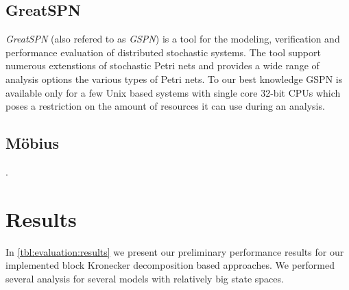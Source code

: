 \subsection{GreatSPN}

\emph{GreatSPN} (also refered to as \emph{GSPN}) \citep{baarir2009greatspn} is a tool for the modeling, verification and performance evaluation of distributed stochastic systems. The tool support numerous extenstions of stochastic Petri nets and provides a wide range of analysis options the various types of Petri nets. To our best knowledge GSPN is available only for a few Unix based systems with single core 32-bit CPUs which poses a restriction on the amount of resources it can use during an analysis.

\subsection{Möbius}

\citep{courtney2009mobius}.

\section{Results}
\label{sec:evaluation:results}

In \cref{tbl:evaluation:results} we present our preliminary performance results for our implemented block Kronecker decomposition based approaches. We performed several analysis for several models with relatively big state spaces. 
